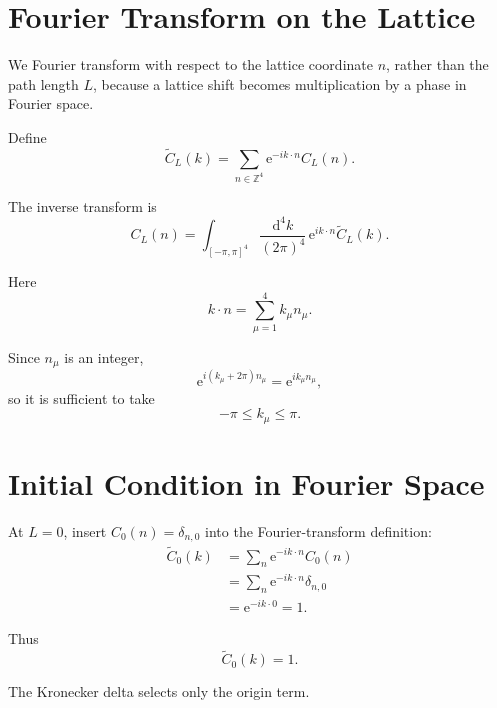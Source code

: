 \documentclass[11pt,a4paper,oneside]{article}
\newcommand{\ee}{\mathrm{e}}
\newcommand{\dd}{\mathrm{d}}
\begin{document}
	\section{Fourier Transform on the Lattice}
	
	We Fourier transform with respect to the lattice coordinate $n$, rather than
	the path length $L$, because a lattice shift becomes multiplication by a phase
	in Fourier space.
	
	Define
	\begin{equation}
		\boxed{
			\widetilde C_L(k)
			=
			\sum_{n\in\mathbb{Z}^4}
			\ee^{-ik\cdot n}C_L(n).
		}
		\label{eq:fourier-forward}
	\end{equation}
	
	The inverse transform is
	\begin{equation}
		\boxed{
			C_L(n)
			=
			\int_{[-\pi,\pi]^4}
			\frac{\dd^4k}{(2\pi)^4}
			\,
			\ee^{ik\cdot n}
			\widetilde C_L(k).
		}
		\label{eq:fourier-inverse}
	\end{equation}
	
	Here
	\[
	k\cdot n
	=
	\sum_{\mu=1}^{4}k_\mu n_\mu.
	\]
	
	Since $n_\mu$ is an integer,
	\[
	\ee^{i(k_\mu+2\pi)n_\mu}
	=
	\ee^{ik_\mu n_\mu},
	\]
	so it is sufficient to take
	\[
	-\pi\leq k_\mu\leq\pi.
	\]
	
	
	\section{Initial Condition in Fourier Space}
	
	At $L=0$, insert $C_0(n)=\delta_{n,0}$ into the Fourier-transform definition:
	\begin{align}
		\widetilde C_0(k)
		&=
		\sum_n
		\ee^{-ik\cdot n}C_0(n)
		\\
		&=
		\sum_n
		\ee^{-ik\cdot n}\delta_{n,0}
		\\
		&=
		\ee^{-ik\cdot0}
		=
		1.
	\end{align}
	
	Thus
	\begin{equation}
		\boxed{
			\widetilde C_0(k)=1.
		}
		\label{eq:C0tilde}
	\end{equation}
	
	The Kronecker delta selects only the origin term.
	
\end{document}

